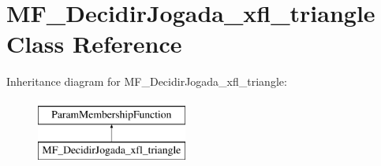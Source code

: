 \hypertarget{classMF__DecidirJogada__xfl__triangle}{
\section{MF\_\-DecidirJogada\_\-xfl\_\-triangle Class Reference}
\label{classMF__DecidirJogada__xfl__triangle}
}
Inheritance diagram for MF\_\-DecidirJogada\_\-xfl\_\-triangle:\begin{figure}[H]
\begin{center}
\leavevmode
\includegraphics[height=2.000000cm]{classMF__DecidirJogada__xfl__triangle}
\end{center}
\end{figure}
